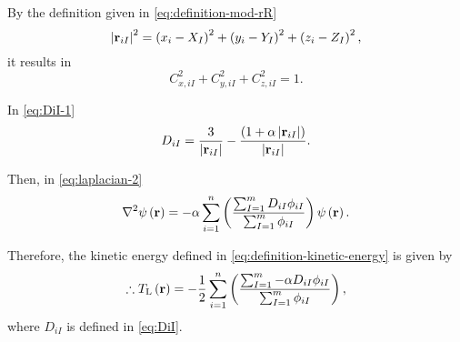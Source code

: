 By the definition given in \cref{eq:definition-mod-rR} 
\begin{equation}
    \left| \boldsymbol{\mathrm{r}}_{iI} \right|^{2}
    =
    \left( x_i - X_I \right)^{2} +
    \left( y_i - Y_I \right)^{2} +
    \left( z_i - Z_I \right)^{2}
    ,
\end{equation}
it results in 
\begin{equation}
    C_{x,iI}^{2} + C_{y,iI}^{2} + C_{z,iI}^{2}
    =
    1
    .
\end{equation}

In \cref{eq:DiI-1}
\begin{equation} \label{eq:DiI}
    D_{iI}
    =
    \frac{3}{\left| \boldsymbol{\mathrm{r}}_{iI} \right|}
    -
    \frac{
        \left( 
            1 + \alpha \left| \boldsymbol{\mathrm{r}}_{iI} \right|
        \right)
    }{
        \left| \boldsymbol{\mathrm{r}}_{iI} \right|
    }
    .
\end{equation}

Then, in \cref{eq:laplacian-2}
\begin{equation} \label{eq:final-laplacian}
    \laplacian \psi \left( \mat{r} \right)
    =
    -\alpha
    \sum_{i=1}^{n} 
    \left(
        \frac{
            \sum_{I=1}^{m} 
            D_{iI}
            \phi_{iI}
        }{
            \sum_{I=1}^{m} \phi_{iI}
        }
    \right)
    \psi \left( \mat{r} \right)
    .
\end{equation}

Therefore, the kinetic energy defined in \cref{eq:definition-kinetic-energy} is
given by 
\begin{equation}
    \therefore
    T_{\mathrm{L}} \left( \boldsymbol{\mathrm{r}} \right)
    =
    -\frac{1}{2}
    \sum_{i=1}^{n} 
    \left(
        \frac{
            \sum_{I=1}^{m} 
            - \alpha
            D_{iI}
            \phi_{iI}
        }{
            \sum_{I=1}^{m} \phi_{iI}
        }
    \right)
    ,
\end{equation}
where $D_{iI}$ is defined in \cref{eq:DiI}.

